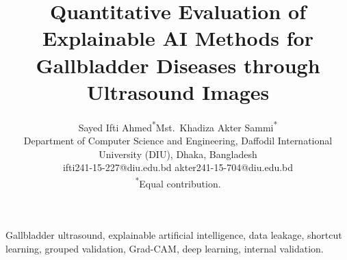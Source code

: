 \documentclass[journal]{IEEEtran}
\title{Quantitative Evaluation of Explainable AI Methods for Gallbladder Diseases through Ultrasound Images}
\author{
\parbox{0.9\linewidth}{\centering
Sayed Ifti Ahmed\textsuperscript{*}\quad Mst.~Khadiza Akter Sammi\textsuperscript{*}\\[4pt]
\normalsize Department of Computer Science and Engineering, Daffodil International University (DIU), Dhaka, Bangladesh\\[2pt]
ifti241-15-227@diu.edu.bd \quad akter241-15-704@diu.edu.bd\\[2pt]
\textsuperscript{*}Equal contribution.
}
}
\begin{document}
\renewcommand{\topfraction}{0.95}
\renewcommand{\bottomfraction}{0.95}
\renewcommand{\textfraction}{0.05}
\renewcommand{\floatpagefraction}{0.75}
\setcounter{topnumber}{6}
\setcounter{bottomnumber}{6}
\setcounter{totalnumber}{10}

\maketitle
\thispagestyle{empty}
\pagestyle{plain}



\begin{IEEEkeywords}
Gallbladder ultrasound, explainable artificial intelligence,
data leakage, shortcut learning, grouped validation, Grad-CAM,
deep learning, internal validation.
\end{IEEEkeywords}













\end{document}
